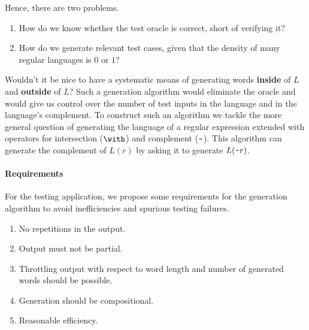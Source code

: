 Hence, there are two problems.
\begin{enumerate}
\item How do we know whether the test oracle is correct, short of
  verifying it?
\item How do we generate relevant test cases, given
  that the density of  many regular languages is
  $0$ or $1$?
\end{enumerate}


Wouldn't it be nice to have a systematic means
of generating words \textbf{inside} of $L$ and \textbf{outside} of
$L$? Such a generation algorithm would eliminate the oracle
and would give us control over the number of test inputs
in the language and in the language's complement.
%
To construct such an algorithm we tackle the more general question of
generating the language of a regular expression extended with
operators for intersection ($\Rintersect{}{}$) and complement
($\texttt{\textasciitilde}{}$). This algorithm can generate the complement of
$L(r)$ by asking it to generate $L(\texttt{\textasciitilde} r)$.

\paragraph{Requirements}
\label{sec:requirements}

For the testing application, we propose some requirements for the generation algorithm to
avoid inefficiencies and spurious testing failures.
\begin{enumerate}
\item No repetitions in the output. %
\item Output must not be partial.
\item Throttling output with respect to word
  length and number of generated words should be possible.
\item Generation should be compositional.
\item Reasonable efficiency.
\end{enumerate}

